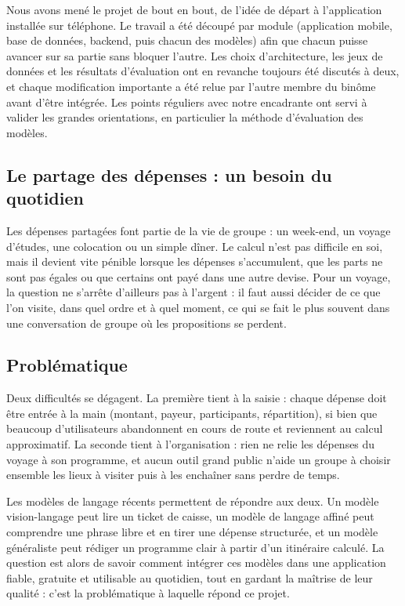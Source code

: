 Nous avons mené le projet de bout en bout, de l'idée de départ à l'application installée sur
téléphone. Le travail a été découpé par module (application mobile, base de données,
backend, puis chacun des modèles) afin que chacun puisse avancer sur sa partie sans bloquer
l'autre. Les choix d'architecture, les jeux de données et les résultats d'évaluation ont en
revanche toujours été discutés à deux, et chaque modification importante a été relue par
l'autre membre du binôme avant d'être intégrée. Les points réguliers avec notre encadrante
ont servi à valider les grandes orientations, en particulier la méthode d'évaluation des
modèles.

\subsection{Le partage des dépenses : un besoin du quotidien}

Les dépenses partagées font partie de la vie de groupe : un week-end, un voyage d'études,
une colocation ou un simple dîner. Le calcul n'est pas difficile en soi, mais il devient
vite pénible lorsque les dépenses s'accumulent, que les parts ne sont pas égales ou que
certains ont payé dans une autre devise. Pour un voyage, la question ne s'arrête d'ailleurs
pas à l'argent : il faut aussi décider de ce que l'on visite, dans quel ordre et à quel
moment, ce qui se fait le plus souvent dans une conversation de groupe où les propositions
se perdent.

\subsection{Problématique}

Deux difficultés se dégagent. La première tient à la saisie : chaque dépense doit être
entrée à la main (montant, payeur, participants, répartition), si bien que beaucoup
d'utilisateurs abandonnent en cours de route et reviennent au calcul approximatif. La
seconde tient à l'organisation : rien ne relie les dépenses du voyage à son programme, et
aucun outil grand public n'aide un groupe à choisir ensemble les lieux à visiter puis à les
enchaîner sans perdre de temps.

Les modèles de langage récents permettent de répondre aux deux. Un modèle vision-langage
peut lire un ticket de caisse, un modèle de langage affiné peut comprendre une phrase libre
et en tirer une dépense structurée, et un modèle généraliste peut rédiger un programme
clair à partir d'un itinéraire calculé. La question est alors de savoir comment intégrer
ces modèles dans une application fiable, gratuite et utilisable au quotidien, tout en
gardant la maîtrise de leur qualité : c'est la problématique à laquelle répond ce projet.

